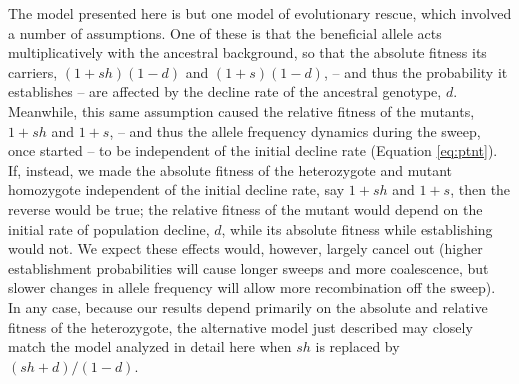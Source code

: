 \documentclass[]{article}
\begin{document}
The model presented here is but one model of evolutionary rescue, which involved a number of assumptions.
One of these is that the beneficial allele acts multiplicatively with the ancestral background, so that the absolute fitness its carriers, $(1+s h)(1-d)$ and $(1+s)(1-d)$, -- and thus the probability it establishes -- are affected by the decline rate of the ancestral genotype, $d$.
Meanwhile, this same assumption caused the relative fitness of the mutants, $1+sh$ and $1+s$, -- and thus the allele frequency dynamics during the sweep, once started -- to be independent of the initial decline rate (Equation \ref{eq:ptnt}).
If, instead, we made the absolute fitness of the heterozygote and mutant homozygote independent of the initial decline rate, say $1 + s h$ and $1 + s$, then the reverse would be true; the relative fitness of the mutant would depend on the initial rate of population decline, $d$, while its absolute fitness while establishing would not. 
We expect these effects would, however, largely cancel out (higher establishment probabilities will cause longer sweeps and more coalescence, but slower changes in allele frequency will allow more recombination off the sweep).
In any case, because our results depend primarily on the absolute and relative fitness of the heterozygote, the alternative model just described may closely match the model analyzed in detail here when $s h$ is replaced by $(s h+d)/(1-d)$.
\end{document}
